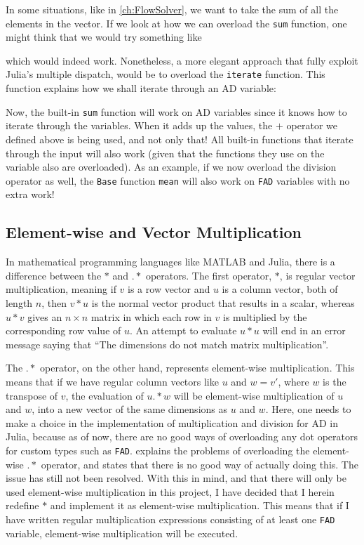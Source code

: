 In some situations, like in \autoref{ch:FlowSolver}, we want to take the sum of all the elements in the vector. If we look at how we can overload the \texttt{sum} function, one might think that we would try something like

which would indeed work. Nonetheless, a more elegant approach that fully exploit Julia's multiple dispatch, would be to overload the \texttt{iterate} function. This function explains how we shall iterate through an AD variable: 

Now, the built-in \texttt{sum} function will work on AD variables since it knows how to iterate through the variables. When it adds up the values, the $+$ operator we defined above is being used, and not only that! All built-in functions that iterate through the input will also work (given that the functions they use on the variable also are overloaded). As an example, if we now overload the division operator as well, the \texttt{Base} function \texttt{mean} will also work on \texttt{FAD} variables with no extra work!

\subsection{Element-wise and Vector Multiplication}
In mathematical programming languages like MATLAB and Julia, there is a difference between the $*$ and $.*$ operators. The first operator, $*$, is regular vector multiplication, meaning if $v$ is a row vector and $u$ is a column vector, both of length $n$, then $v*u$ is the normal vector product that results in a scalar, whereas $u*v$ gives an $n\times n$ matrix in which each row in $v$ is multiplied by the corresponding row value of $u$. An attempt to evaluate $u*u$ will end in an error message saying that \enquote{The dimensions do not match matrix multiplication}. 

The $.*$ operator, on the other hand, represents element-wise multiplication. This means that if we have regular column vectors like $u$ and $w = v'$, where $w$ is the transpose of $v$, the evaluation of $u.*w$ will be element-wise multiplication of $u$ and $w$, into a new vector of the same dimensions as $u$ and $w$. Here, one needs to make a choice in the implementation of multiplication and division for AD in Julia, because as of now, there are no good ways of overloading any dot operators for custom types such as \texttt{FAD}. \emph{\citet{JuliaIssueDot}} explains the problems of overloading the element-wise $.*$ operator, and states that there is no good way of actually doing this. The issue has still not been resolved. With this in mind, and that there will only be used element-wise multiplication in this project, I have decided that I herein redefine $*$ and implement it as element-wise multiplication. This means that if I have written regular multiplication expressions consisting of at least one \texttt{FAD} variable, element-wise multiplication will be executed.

